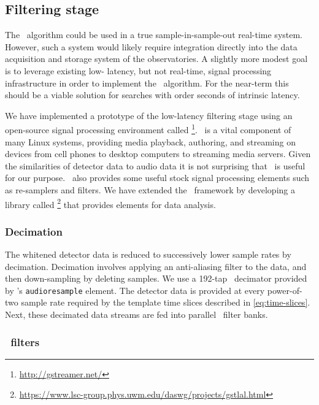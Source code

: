\subsection{Filtering stage}

The \lloid\ algorithm could be used in a true sample-in-sample-out real-time
system.  However, such a system would likely require integration directly into
the data acquisition and storage system of the \GW{}
observatories.  A slightly more modest goal is to leverage existing low-%
latency, but not real-time, signal processing infrastructure in order to
implement the \lloid\ algorithm.  For the near-term this should be a viable 
solution for searches with order seconds of intrinsic latency.

We have implemented a prototype of the low-latency filtering stage using an
open-source signal processing environment called
\gstreamer\footnote{\url{http://gstreamer.net/}}.
\gstreamer\ is a vital component of many Linux systems, providing media
playback, authoring, and streaming on devices from cell phones to desktop
computers to streaming media servers.  Given the similarities of
\GW{} detector data to audio data it is not surprising that
\gstreamer\ is useful for our purpose. \gstreamer\ also provides some useful
stock signal processing elements such as re-samplers and filters.  We have
extended the \gstreamer\ framework by developing a library called
\gstlal\footnote{\url{https://www.lsc-group.phys.uwm.edu/daswg/projects/gstlal.html}}
that provides elements for \GW{} data analysis.

\subsubsection{Decimation}

The whitened detector data is reduced to successively
lower sample rates by decimation. Decimation involves applying an anti-aliasing
filter to the data, and then down-sampling by deleting samples.  We use a
192-tap \fir\ decimator provided by \gstreamer{}'s {\tt audioresample}
element.  The detector data is provided at every power-of-two sample rate
required by the template time slices described in \eqref{eq:time-slices}. Next,
these decimated data streams are fed into parallel \fir\ filter banks.

\subsubsection{\fir\ filters}

